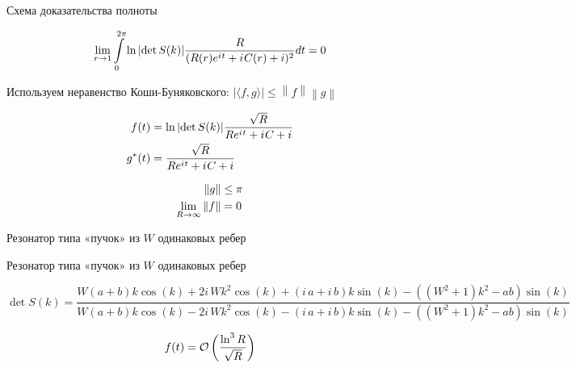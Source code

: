 \documentclass{beamer}
\begin{document}


\begin{frame}{Схема доказательства полноты}

\[
\lim\limits_{r \to 1} \int\limits_{0}^{2 \pi} \ln \abs{\det S(k)} \frac{R}{(R(r) \eexp{\iu t} + \iu C(r) + i)^2} dt = 0
\]

Используем неравенство Коши-Буняковского: $\big| \langle f,g \rangle \big| \leq \left\|f\right\| \left\|g\right\|$

\begin{align*}
f(t)   &= \ln \abs{\det S(k)} \frac{\sqrt{R}}{R \eexp{\iu t} + \iu C + i} \\
g^*(t) &= \frac{\sqrt{R}}{R \eexp{\iu t} + \iu C + i}
\end{align*}

\begin{align*}
\norm{g} &\le \pi \\
\lim_{R \to \infty} \norm{f} &= 0
\end{align*}
\end{frame}



\begin{frame}{Резонатор типа «пучок» из $W$ одинаковых ребер}

\begin{figure}
\begin{tikzpicture}[scale=0.8]

\end{tikzpicture}
\end{figure}

\end{frame}


\begin{frame}{Резонатор типа «пучок» из $W$ одинаковых ребер}

{
\scriptsize
\[
\det S(k) = \frac{W {\left(a + b\right)} k \cos\left(k\right) + 2 i \, W k^{2} \cos\left(k\right) + {\left(i \, a + i \, b\right)} k \sin\left(k\right) - {\left({\left(W^{2} + 1\right)} k^{2} - a b\right)} \sin\left(k\right)}{W {\left(a + b\right)} k \cos\left(k\right) - 2 i \, W k^{2} \cos\left(k\right) - {\left(i \, a + i \, b\right)} k \sin\left(k\right) - {\left({\left(W^{2} + 1\right)} k^{2} - a b\right)} \sin\left(k\right)}
\]
}

\[
f(t) =  \mcO\left( \frac{\ln^3 R}{\sqrt{R}} \right)
\]
\end{frame}
\end{document}
